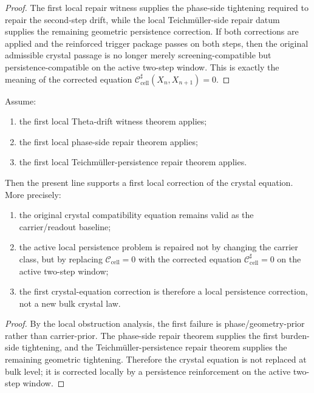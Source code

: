 \begin{proof}
The first local repair witness supplies the phase-side tightening required to repair the second-step drift, while the local Teichmüller-side repair datum supplies the remaining geometric persistence correction. If both corrections are applied and the reinforced trigger package passes on both steps, then the original admissible crystal passage is no longer merely screening-compatible but persistence-compatible on the active two-step window. This is exactly the meaning of the corrected equation $\mathcal C_{\mathrm{cell}}^{\sharp}(X_n,X_{n+1})=0$.
\end{proof}

\begin{theorem}
\label{thm:first-local-crystal-equation-correction-theorem}
Assume:
\begin{enumerate}[leftmargin=2em,label=(\roman*)]
  \item the first local Theta-drift witness theorem applies;
  \item the first local phase-side repair theorem applies;
  \item the first local Teichmüller-persistence repair theorem applies.
\end{enumerate}
Then the present line supports a first local correction of the crystal equation.
More precisely:
\begin{enumerate}[leftmargin=2em,label=(\alph*)]
  \item the original crystal compatibility equation remains valid as the carrier/readout baseline;
  \item the active local persistence problem is repaired not by changing the carrier class, but by replacing $\mathcal C_{\mathrm{cell}}=0$ with the corrected equation $\mathcal C_{\mathrm{cell}}^{\sharp}=0$ on the active two-step window;
  \item the first crystal-equation correction is therefore a local persistence correction, not a new bulk crystal law.
\end{enumerate}
\end{theorem}

\begin{proof}
By the local obstruction analysis, the first failure is phase/geometry-prior rather than carrier-prior. The phase-side repair theorem supplies the first burden-side tightening, and the Teichmüller-persistence repair theorem supplies the remaining geometric tightening. Therefore the crystal equation is not replaced at bulk level; it is corrected locally by a persistence reinforcement on the active two-step window.
\end{proof}


